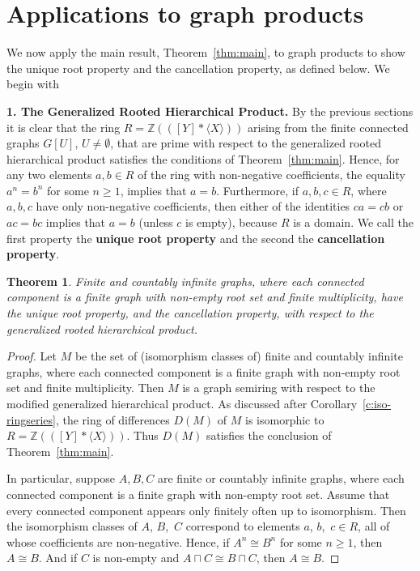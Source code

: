 \documentclass{amsart}
\theoremstyle{plain}
\newtheorem{theorem}[thm]{Theorem}
\theoremstyle{definition}
\newcommand{\defit}[1]{\textbf{#1}}
\newcommand{\bZ}{\mathbb Z}
\newcommand{\hmnser}[2]{{#1}(\!({#2})\!)}
\begin{document}
\section{Applications to graph products}\label{sec:applications}

We now apply the main result, Theorem~\ref{thm:main}, to graph products to show
the unique root property and the  cancellation property, as defined below. We begin with
\smallskip

\noindent\textbf{1.  The Generalized Rooted Hierarchical Product.}
By the previous sections it is clear that the ring $R=\hmnser{\bZ}{[Y]*\langle X \rangle}$ arising from the finite connected graphs $G[U]$, $U\neq \emptyset$, that are prime with respect to the generalized rooted hierarchical product satisfies the conditions of Theorem~\ref{thm:main}. Hence, for any two elements $a, b\in R$ of the ring with non-negative coefficients, the equality  $a^n = b^n$ for some  $n\ge 1$, implies that $a=b$.
Furthermore, if $a,b,c \in R$, where $a,b,c$ have only non-negative coefficients, then either of the identities $ca=cb$ or $ac=bc$ implies that $a=b$ (unless $c$ is empty), because $R$ is a domain.
We call the first property the \defit{unique root property}  and the second the \defit{cancellation property}.


\begin{theorem}\label{thm:rghp} Finite and countably infinite graphs, where each connected component is a finite graph with non-empty root set and finite multiplicity,  have the unique root property, and the cancellation property, with respect to the generalized rooted hierarchical product.
\end{theorem}

\begin{proof}
  Let $M$ be the set of (isomorphism classes of) finite and countably infinite graphs, where each connected component is a finite graph with non-empty root set and finite multiplicity.
  Then $M$ is a graph semiring with respect to the modified generalized hierarchical product.
  As discussed after Corollary~\ref{c:iso-ringseries}, the ring of differences $D(M)$ of $M$ is isomorphic to $R=\hmnser{\bZ}{[Y]*\langle X \rangle}$.
  Thus $D(M)$ satisfies the conclusion of Theorem~\ref{thm:main}.

  In particular, suppose $A,B,C$ are finite or countably infinite graphs, where each connected component is a finite graph with non-empty root set.
  Assume that every connected component appears only finitely often up to isomorphism.
  Then the isomorphism classes of  $A$, $B$,~$C$ correspond to elements $a$, $b$,~$c\in R$, all of whose coefficients are non-negative.
  Hence, if $A^n \cong B^n$ for some $n \ge 1$, then $A \cong B$.
  And if $C$ is non-empty and $A \sqcap C \cong B \sqcap C$, then $A \cong B$.
\end{proof}
\end{document}
